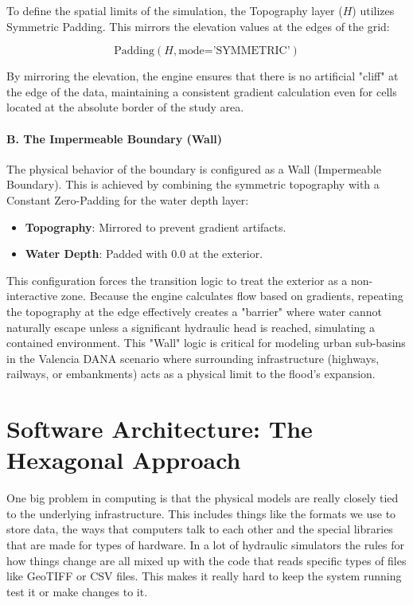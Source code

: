 To define the spatial limits of the simulation, the Topography layer ($H$) utilizes Symmetric Padding. This mirrors the elevation 
values at the edges of the grid:

$$\text{Padding}(H, \text{mode='SYMMETRIC'})$$

By mirroring the elevation, the engine ensures that there is no artificial "cliff" at the edge of the data, maintaining a consistent 
gradient calculation even for cells located at the absolute border of the study area.

\paragraph{B. The Impermeable Boundary (Wall)}

The physical behavior of the boundary is configured as a Wall (Impermeable Boundary). This is achieved by combining the symmetric 
topography with a Constant Zero-Padding for the water depth layer:

\begin{itemize}
    \item \textbf{Topography}: Mirrored to prevent gradient artifacts.

    \item \textbf{Water Depth}: Padded with $0.0$ at the exterior.
\end{itemize}

This configuration forces the transition logic to treat the exterior as a non-interactive zone. Because the engine calculates flow 
based on gradients, repeating the topography at the edge effectively creates a "barrier" where water cannot naturally escape unless a 
significant hydraulic head is reached, simulating a contained environment. This "Wall" logic is critical for modeling urban sub-basins 
in the Valencia DANA scenario where surrounding infrastructure (highways, railways, or embankments) acts as a physical limit to the 
flood's expansion.


\section{Software Architecture: The Hexagonal Approach}

One big problem in computing is that the physical models are really closely tied to the underlying infrastructure. This includes things 
like the formats we use to store data, the ways that computers talk to each other and the special libraries that are made for types of 
hardware. In a lot of hydraulic simulators the rules for how things change are all mixed up with the code that reads specific types of 
files like GeoTIFF or CSV files. This makes it really hard to keep the system running test it or make changes to it.

